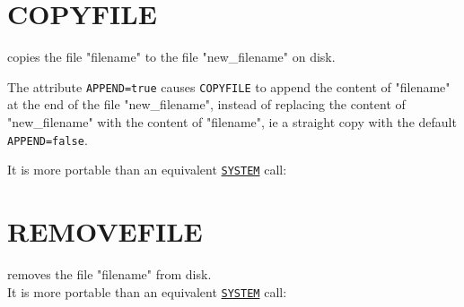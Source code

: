 \section{COPYFILE}
\label{sec:copyfile}
copies the file "filename" to the file "new\_filename" on disk.

The attribute {\tt APPEND=true} causes {\tt COPYFILE} to append the content of 
"filename" at the end of the file "new\_filename", instead of replacing the 
content of "new\_filename" with the content of "filename", ie a straight copy 
with the default {\tt APPEND=false}.

It is more portable than an equivalent \hyperref[sec:system]{\tt SYSTEM} call:


\section{REMOVEFILE}
\label{sec:removefile}
removes the file "filename" from disk. \\
It is more portable than an equivalent \hyperref[sec:system]{\tt SYSTEM} call: 



